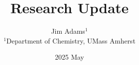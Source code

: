 \documentclass[letterpaper,10pt]{myreport}
\title{\bfseries Research Update}
\author{Jim Adams$^{1}$ \\
        $^{1}$Department of Chemistry, UMass Amherst}
\date{2025 May}
\begin{document}
\maketitle
\thispagestyle{firstpage}
\begin{sloppypar}   %




\newpage
% 


\end{sloppypar}
\end{document}
